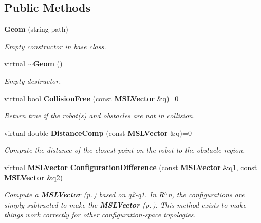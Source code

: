 \subsection*{Public Methods}
\begin{CompactItemize}
\item 
{\bf Geom} (string path)
\begin{CompactList}\small\item\em Empty constructor in base class.\item\end{CompactList}\item 
virtual {\bf $\sim$Geom} ()
\begin{CompactList}\small\item\em Empty destructor.\item\end{CompactList}\item 
virtual bool {\bf Collision\-Free} (const {\bf MSLVector} \&q)=0
\begin{CompactList}\small\item\em Return true if the robot(s) and obstacles are not in collision.\item\end{CompactList}\item 
virtual double {\bf Distance\-Comp} (const {\bf MSLVector} \&q)=0
\begin{CompactList}\small\item\em Compute the distance of the closest point on the robot to the obstacle region.\item\end{CompactList}\item 
virtual {\bf MSLVector} {\bf Configuration\-Difference} (const {\bf MSLVector} \&q1, const {\bf MSLVector} \&q2)
\begin{CompactList}\small\item\em Compute a {\bf MSLVector} {\rm (p.\,\pageref{classMSLVector})} based on q2-q1. In R$^\wedge$n, the configurations are simply subtracted to make the {\bf MSLVector} {\rm (p.\,\pageref{classMSLVector})}. This method exists to make things work correctly for other configuration-space topologies.\item\end{CompactList}\end{CompactItemize}
